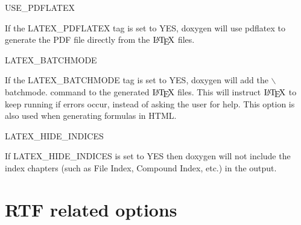 \begin{DoxyDescription}
\label{config_cfg_use_pdflatex}
\hypertarget{config_cfg_use_pdflatex}{}
 
\item[{\ttfamily USE\_\-PDFLATEX} ]

If the {\ttfamily LATEX\_\-PDFLATEX} tag is set to {\ttfamily YES}, doxygen will use pdflatex to generate the PDF file directly from the $\mbox{\LaTeX}$ files.

\label{config_cfg_latex_batchmode}
\hypertarget{config_cfg_latex_batchmode}{}
 
\item[{\ttfamily LATEX\_\-BATCHMODE} ]

If the {\ttfamily LATEX\_\-BATCHMODE} tag is set to {\ttfamily YES}, doxygen will add the $\backslash$batchmode. command to the generated $\mbox{\LaTeX}$ files. This will instruct $\mbox{\LaTeX}$ to keep running if errors occur, instead of asking the user for help. This option is also used when generating formulas in HTML.

\label{config_cfg_latex_hide_indices}
\hypertarget{config_cfg_latex_hide_indices}{}
 
\item[{\ttfamily LATEX\_\-HIDE\_\-INDICES} ]

If {\ttfamily LATEX\_\-HIDE\_\-INDICES} is set to {\ttfamily YES} then doxygen will not include the index chapters (such as File Index, Compound Index, etc.) in the output.


\end{DoxyDescription}\hypertarget{config_rtf_output}{}\section{RTF related options}\label{config_rtf_output}
\label{config_cfg_generate_rtf}
\hypertarget{config_cfg_generate_rtf}{}
 
